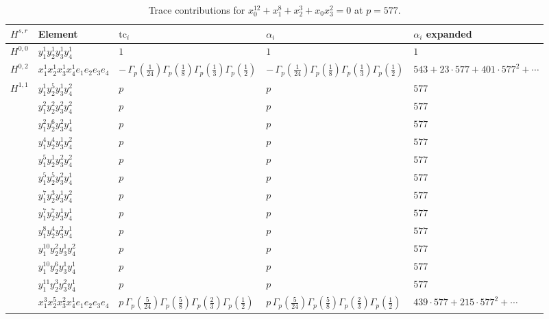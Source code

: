 \documentclass[11pt]{article}
\begin{document}
\begin{table}[ht]
\centering
\caption{Trace contributions for $x_0^{12} + x_1^{8} + x_2^{3} + x_0 x_3^{2} = 0$ at $p=577$.}\label{tab:deformed-64}
\renewcommand{\arraystretch}{1.1}
{\scriptsize
\begin{tabular}{@{}lllll@{}}
\toprule
$H^{s,r}$ & Element & $\mathrm{tc}_i$ & $\alpha_i$ & $\alpha_i$ expanded \\
\midrule
$H^{0,0}$ & $y_{1}^{1} y_{2}^{1} y_{3}^{1} y_{4}^{1}$ & $1$ & $1$ & $1$ \\
\midrule
$H^{0,2}$ & $x_{1}^{1} x_{2}^{1} x_{3}^{1} x_{4}^{1}  e_{1} e_{2} e_{3} e_{4}$ & $- \, \Gamma_p \left( \frac{1}{24} \right) \Gamma_p \left( \frac{1}{8} \right) \Gamma_p \left( \frac{1}{3} \right) \Gamma_p \left( \frac{1}{2} \right)$ & $- \, \Gamma_p \left( \frac{1}{24} \right) \Gamma_p \left( \frac{1}{8} \right) \Gamma_p \left( \frac{1}{3} \right) \Gamma_p \left( \frac{1}{2} \right)$ & $543{+}23{\cdot}577{+}401{\cdot}577^{2}{+}\cdots$ \\
\midrule
$H^{1,1}$ & $y_{1}^{1} y_{2}^{5} y_{3}^{1} y_{4}^{2}$ & $p \,$ & $p \,$ & $577$ \\
 & $y_{1}^{2} y_{2}^{2} y_{3}^{2} y_{4}^{2}$ & $p \,$ & $p \,$ & $577$ \\
 & $y_{1}^{2} y_{2}^{6} y_{3}^{2} y_{4}^{1}$ & $p \,$ & $p \,$ & $577$ \\
 & $y_{1}^{4} y_{2}^{4} y_{3}^{1} y_{4}^{2}$ & $p \,$ & $p \,$ & $577$ \\
 & $y_{1}^{5} y_{2}^{1} y_{3}^{2} y_{4}^{2}$ & $p \,$ & $p \,$ & $577$ \\
 & $y_{1}^{5} y_{2}^{5} y_{3}^{2} y_{4}^{1}$ & $p \,$ & $p \,$ & $577$ \\
 & $y_{1}^{7} y_{2}^{3} y_{3}^{1} y_{4}^{2}$ & $p \,$ & $p \,$ & $577$ \\
 & $y_{1}^{7} y_{2}^{7} y_{3}^{1} y_{4}^{1}$ & $p \,$ & $p \,$ & $577$ \\
 & $y_{1}^{8} y_{2}^{4} y_{3}^{2} y_{4}^{1}$ & $p \,$ & $p \,$ & $577$ \\
 & $y_{1}^{10} y_{2}^{2} y_{3}^{1} y_{4}^{2}$ & $p \,$ & $p \,$ & $577$ \\
 & $y_{1}^{10} y_{2}^{6} y_{3}^{1} y_{4}^{1}$ & $p \,$ & $p \,$ & $577$ \\
 & $y_{1}^{11} y_{2}^{3} y_{3}^{2} y_{4}^{1}$ & $p \,$ & $p \,$ & $577$ \\
 & $x_{1}^{3} x_{2}^{5} x_{3}^{2} x_{4}^{1}  e_{1} e_{2} e_{3} e_{4}$ & $p \, \Gamma_p \left( \frac{5}{24} \right) \Gamma_p \left( \frac{5}{8} \right) \Gamma_p \left( \frac{2}{3} \right) \Gamma_p \left( \frac{1}{2} \right)$ & $p \, \Gamma_p \left( \frac{5}{24} \right) \Gamma_p \left( \frac{5}{8} \right) \Gamma_p \left( \frac{2}{3} \right) \Gamma_p \left( \frac{1}{2} \right)$ & $439{\cdot}577{+}215{\cdot}577^{2}{+}\cdots$ \\

\end{tabular}}
\end{table}
\end{document}

